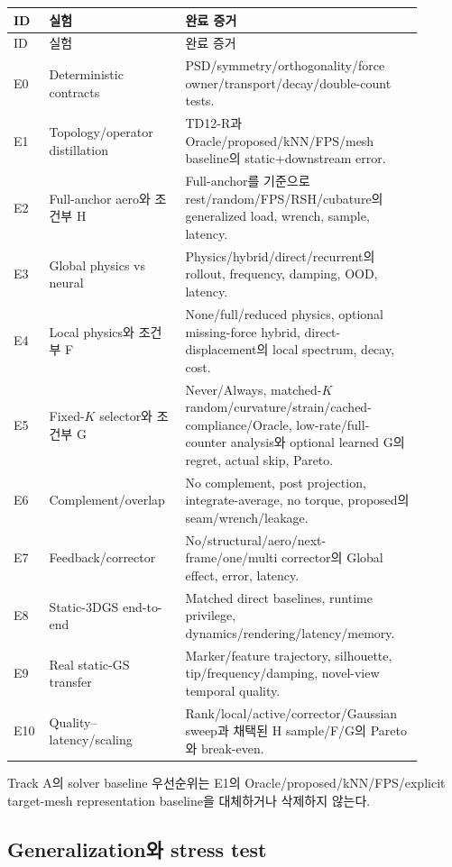 \documentclass[10pt,a4paper]{article}
\begin{document}
\begin{longtable}{L{0.07\linewidth}L{0.31\linewidth}L{0.52\linewidth}}
\toprule
ID & 실험 & 완료 증거 \\
\midrule
\endfirsthead
\toprule
ID & 실험 & 완료 증거 \\
\midrule
\endhead
E0 & Deterministic contracts & PSD/symmetry/orthogonality/force owner/transport/decay/double-count tests. \\
E1 & Topology/operator distillation & TD12-R과 Oracle/proposed/kNN/FPS/mesh baseline의 static+downstream error. \\
E2 & Full-anchor aero와 조건부 H & Full-anchor를 기준으로 rest/random/FPS/RSH/cubature의 generalized load, wrench, sample, latency. \\
E3 & Global physics vs neural & Physics/hybrid/direct/recurrent의 rollout, frequency, damping, OOD, latency. \\
E4 & Local physics와 조건부 F & None/full/reduced physics, optional missing-force hybrid, direct-displacement의 local spectrum, decay, cost. \\
E5 & Fixed-\(K\) selector와 조건부 G & Never/Always, matched-\(K\) random/curvature/strain/cached-compliance/Oracle, low-rate/full-counter analysis와 optional learned G의 regret, actual skip, Pareto. \\
E6 & Complement/overlap & No complement, post projection, integrate-average, no torque, proposed의 seam/wrench/leakage. \\
E7 & Feedback/corrector & No/structural/aero/next-frame/one/multi corrector의 Global effect, error, latency. \\
E8 & Static-3DGS end-to-end & Matched direct baselines, runtime privilege, dynamics/rendering/latency/memory. \\
E9 & Real static-GS transfer & Marker/feature trajectory, silhouette, tip/frequency/damping, novel-view temporal quality. \\
E10 & Quality--latency/scaling & Rank/local/active/corrector/Gaussian sweep과 채택된 H sample/F/G의 Pareto와 break-even. \\
\bottomrule
\end{longtable}

Track A의 solver baseline 우선순위는 E1의 Oracle/proposed/kNN/FPS/explicit target-mesh
representation baseline을 대체하거나 삭제하지 않는다.

\subsection*{Generalization와 stress test}
\end{document}
